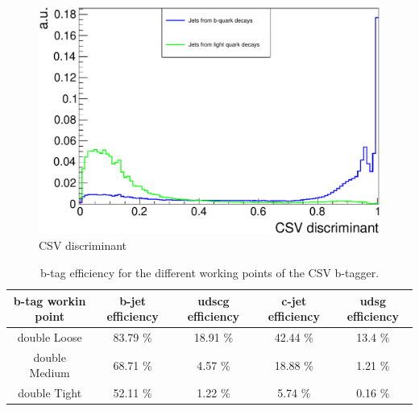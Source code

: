 \begin{figure}[h!t]
 \centering
 \includegraphics[width = 0.85 \textwidth]{Chapters/Chapter4_EvtSel/Figures/CSVDiscr_LightAndBJets.pdf}
 \caption{CSV discriminant} \label{fig::CSVDiscr}
\end{figure}

\begin{table}[h!t]
 \centering
 \caption{b-tag efficiency for the different working points of the CSV b-tagger.}
 \begin{tabular}{c|c|c|c|c}
  b-tag workin point 	& b-jet efficiency 	& udscg efficiency 	& c-jet efficiency 	& udsg efficiency 	\\
  \hline
  double Loose 		& 83.79 $\%$		& 18.91 $\%$		& 42.44 $\%$ 		& 13.4 $\%$		\\
  double Medium 	& 68.71 $\%$		& 4.57 $\%$		& 18.88 $\%$		& 1.21 $\%$		\\
  double Tight 		& 52.11 $\%$ 		& 1.22 $\%$ 		& 5.74 $\%$ 		& 0.16 $\%$ 		\\
 \end{tabular}
\end{table}


